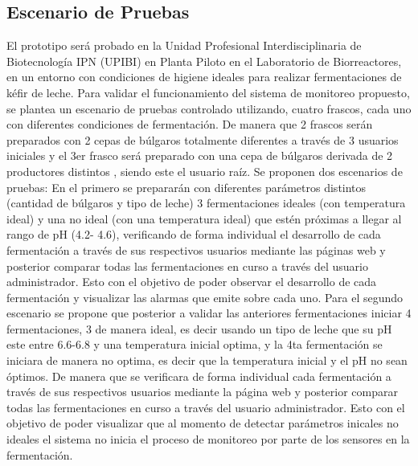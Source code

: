 \subsection{Escenario de Pruebas}
El prototipo será probado en la Unidad Profesional Interdisciplinaria de
Biotecnología IPN (UPIBI) en Planta Piloto en el Laboratorio de Biorreactores, en un
entorno con condiciones de higiene ideales para realizar fermentaciones de kéfir de
leche. Para validar el funcionamiento del sistema de monitoreo propuesto, se
plantea un escenario de pruebas controlado utilizando, cuatro frascos, cada uno con
diferentes condiciones de fermentación. De manera que 2 frascos serán preparados con 2 cepas de búlgaros totalmente diferentes a través de 3 usuarios iniciales y el
3er frasco será preparado con una cepa de búlgaros derivada de 2 productores distintos
, siendo este el usuario raíz.
Se proponen dos escenarios de pruebas:
En el primero se prepararán con diferentes parámetros distintos (cantidad de
búlgaros y tipo de leche) 3 fermentaciones ideales (con temperatura ideal) y una no
ideal (con una temperatura ideal) que estén próximas a llegar al rango de pH (4.2-
4.6), verificando de forma individual el desarrollo de cada fermentación a través de
sus respectivos usuarios mediante las páginas web y posterior comparar todas las
fermentaciones en curso a través del usuario administrador. Esto con el objetivo de
poder observar el desarrollo de cada fermentación y visualizar las alarmas que emite
sobre cada uno.
Para el segundo escenario se propone que posterior a validar las anteriores
fermentaciones iniciar 4 fermentaciones, 3 de manera ideal, es decir usando un tipo
de leche que su pH este entre 6.6-6.8 y una temperatura inicial optima, y la 4ta
fermentación se iniciara de manera no optima, es decir que la temperatura inicial y
el pH no sean óptimos. De manera que se verificara de forma individual cada
fermentación a través de sus respectivos usuarios mediante la página web y
posterior comparar todas las fermentaciones en curso a través del usuario
administrador. Esto con el objetivo de poder visualizar que al momento de detectar
parámetros inicales no ideales el sistema no inicia el proceso de monitoreo por parte
de los sensores en la fermentación.
